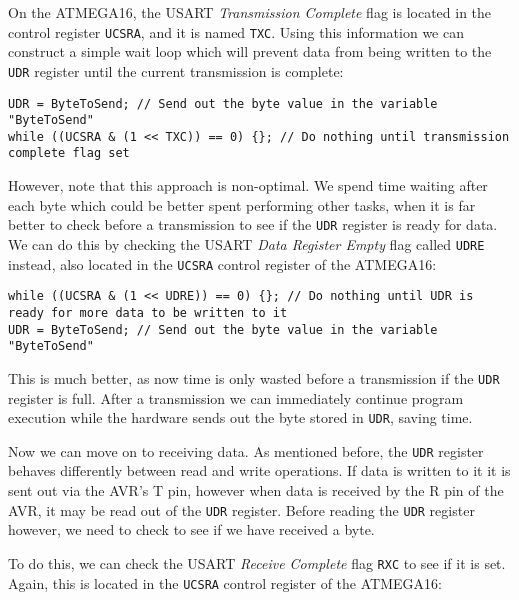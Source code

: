 \documentclass[a4paper,oneside,notitlepage]{book}
\begin{document}
On the ATMEGA16, the USART \emph{Transmission Complete} flag is located in the control register \texttt{UCSRA}, and it is named \texttt{TXC}. Using this information we can construct a simple wait loop which will prevent data from being written to the \texttt{UDR} register until the current transmission is complete:

\begin{center}
\begin{lstlisting}
UDR = ByteToSend; // Send out the byte value in the variable "ByteToSend"
while ((UCSRA & (1 << TXC)) == 0) {}; // Do nothing until transmission complete flag set
\end{lstlisting}
\end{center}

However, note that this approach is non-optimal. We spend time waiting after each byte which could be better spent performing other tasks, when it is far better to check before a transmission to see if the \texttt{UDR} register is ready for data. We can do this by checking the USART \emph{Data Register Empty} flag called \texttt{UDRE} instead, also located in the \texttt{UCSRA} control register of the ATMEGA16:

\begin{center}
\begin{lstlisting}
while ((UCSRA & (1 << UDRE)) == 0) {}; // Do nothing until UDR is ready for more data to be written to it
UDR = ByteToSend; // Send out the byte value in the variable "ByteToSend"
\end{lstlisting}
\end{center}

This is much better, as now time is only wasted before a transmission if the \texttt{UDR} register is full. After a transmission we can immediately continue program execution while the hardware sends out the byte stored in \texttt{UDR}, saving time.


Now we can move on to receiving data. As mentioned before, the \texttt{UDR} register behaves differently between read and write operations. If data is written to it it is sent out via the AVR's T pin, however when data is received by the R pin of the AVR, it may be read out of the \texttt{UDR} register. Before reading the \texttt{UDR} register however, we need to check to see if we have received a byte.

To do this, we can check the USART \emph{Receive Complete} flag \texttt{RXC} to see if it is set. Again, this is located in the \texttt{UCSRA} control register of the ATMEGA16:
\end{document}
